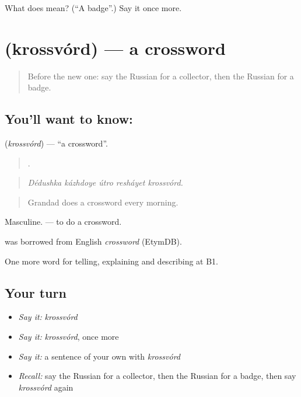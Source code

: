 \begin{tcolorbox}[breakable,colback=teal!4,colframe=teal!35!black,title={Before you move on}]
What does  mean? (\textquotedblleft{}A badge\textquotedblright{}.) Say it once more.
\end{tcolorbox}
\section[\texorpdfstring{\ru{кроссворд} (krossvórd)}{кроссворд (krossvórd)}]{ (krossvórd) — a crossword}

\label{lesson:RU-C503-krossvord}



\begin{quote}
Before the new one: say the Russian for a collector, then the Russian for a badge.
\end{quote}

\subsection*{You'll want to know: }
\textbf{} (\emph{krossvórd}) — \textquotedblleft{}a crossword\textquotedblright{}.

\begin{quote}
    .
\end{quote}

\begin{quote}
\emph{Dédushka kázhdoye útro resháyet krossvórd.}
\end{quote}

\begin{quote}
Grandad does a crossword every morning.
\end{quote}

Masculine. \emph{ } — to do a crossword.

\begin{cousinweb}
\emph{} was borrowed from English \emph{crossword} (EtymDB).
\end{cousinweb}

\begin{grammarlens}[title={What you've built}]
One more word for telling, explaining and describing at B1.
\end{grammarlens}

\subsection*{Your turn}
\begin{itemize}
\raggedright
  \item \emph{Say it:} \emph{krossvórd}
  \item \emph{Say it:} \emph{krossvórd}, once more
  \item \emph{Say it:} a sentence of your own with \emph{krossvórd}
  \item \emph{Recall:} say the Russian for a collector, then the Russian for a badge, then say \emph{krossvórd} again
\end{itemize}


